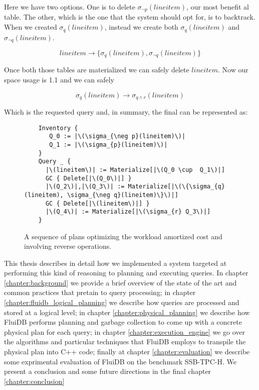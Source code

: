 Here we have two options. One is to delete \(\sigma_{\neg
  p}(lineitem)\), our most benefit al table. The other, which is the one
that the system should opt for, is to backtrack. When we created
\(\sigma_{q}(lineitem)\), instead we create both
\(\sigma_{q}(lineitem)\) and \(\sigma_{\neg q}(lineitem)\).

\[
  lineitem \rightarrow \{\sigma_{q}(lineitem), \sigma_{\neg q}(lineitem)\}
\]

Once both those tables are materialized we can safely delete
\(lineitem\). Now our space usage is 1.1 and we can safely

\[
  \sigma_{q}(lineitem) \rightarrow \sigma_{q \land r} (lineitem)
\]

Which is the requested query and, in summary, the final can be
represented as:


\begin{figure}[H]
\begin{verbatim}
    Inventory {
       Q_0 := |\(\sigma_{\neg p}(lineitem)\)|
       Q_1 := |\(\sigma_{p}(lineitem)\)|
    }
    Query _ {
      |\(lineitem\)| := Materialize[|\(Q_0 \cup  Q_1\)|]
      GC { Delete[|\(Q_0\)|] }
      |\(Q_2\)|,|\(Q_3\)| := Materialize[|\(\{\sigma_{q}(lineitem), \sigma_{\neg q}(lineitem)\}\)|]
      GC { Delete[|\(lineitem\)|] }
      |\(Q_4\)| := Materialize[|\(\sigma_{r} Q_3\)|]
    }
\end{verbatim}
  \caption{\label{fig:reverse_operations}A sequence of plans optimizing
    the workload amortized cost and involving reverse operations.}
\end{figure}

This thesis describes in detail how we implemented a system targeted
at performing this kind of reasoning to planning and executing
queries. In chapter \ref{chapter:background} we provide a brief
overview of the state of the art and common practices that pretain to
query processing; in chapter \ref{chapter:fluidb_logical_planning} we
describe how queries are processed and stored at a logical level; in
chapter \ref{chapter:physical_planning} we describe how FluiDB
performs planning and garbage collection to come up with a concrete
physical plan for each query; in chapter
\ref{chapter:execution_engine} we go over the algorithms and
particular techniques that FluiDB employs to transpile the physical
plan into C++ code; finally at chapter \ref{chapter:evaluation} we
describe some exprimental evaluation of FluiDB on the benchmark
SSB-TPC-H. We present a conclusion and some future directions in the
final chapter \ref{chapter:conclusion}

